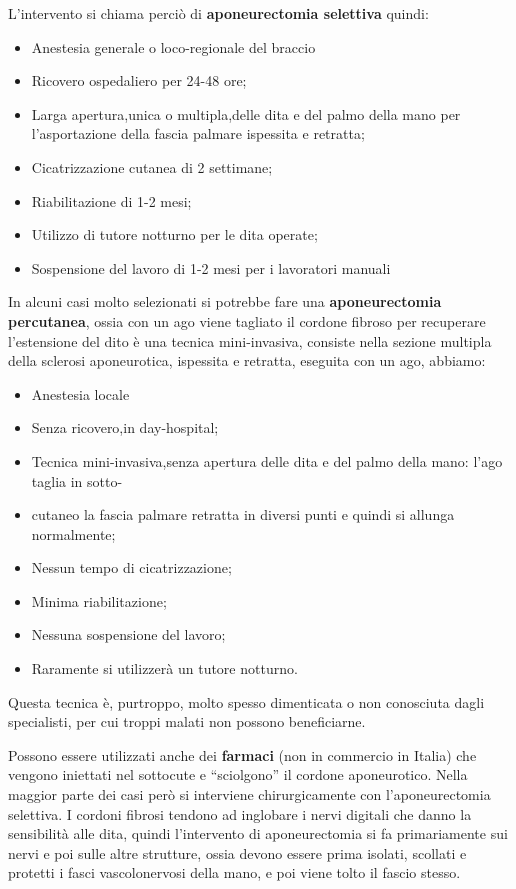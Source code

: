 L'intervento si chiama perciò di \textbf{aponeurectomia selettiva} quindi:

\begin{itemize}
\item
  Anestesia generale o loco-regionale del braccio
\item
  Ricovero ospedaliero per 24-48 ore;
\item
  Larga apertura,unica o multipla,delle dita e del palmo della mano per l'asportazione della fascia palmare ispessita e retratta;
\item
  Cicatrizzazione cutanea di 2 settimane;
\item
  Riabilitazione di 1-2 mesi;
\item
  Utilizzo di tutore notturno per le dita operate;
\item
  Sospensione del lavoro di 1-2 mesi per i lavoratori manuali
\end{itemize}

In alcuni casi molto selezionati si potrebbe fare una \textbf{aponeurectomia percutanea}, ossia con un ago viene tagliato il cordone fibroso per recuperare l'estensione del dito è una tecnica mini-invasiva, consiste nella sezione multipla della sclerosi
aponeurotica, ispessita e retratta, eseguita con un ago, abbiamo:

\begin{itemize}
\item
  Anestesia locale
\item
  Senza ricovero,in day-hospital;
\item
  Tecnica mini-invasiva,senza apertura delle dita e del palmo della mano: l'ago taglia in sotto-
\item
  cutaneo la fascia palmare retratta in diversi punti e quindi si allunga normalmente;
\item
  Nessun tempo di cicatrizzazione;
\item
  Minima riabilitazione;
\item
  Nessuna sospensione del lavoro;
\item
  Raramente si utilizzerà un tutore notturno.
\end{itemize}

Questa tecnica è, purtroppo, molto spesso dimenticata o non conosciuta dagli specialisti, per cui troppi malati non possono beneficiarne.

Possono essere utilizzati anche dei \textbf{farmaci} (non in commercio in Italia) che vengono iniettati nel sottocute e ``sciolgono'' il cordone aponeurotico. Nella maggior parte dei casi però si interviene chirurgicamente con l'aponeurectomia selettiva. I cordoni fibrosi tendono ad inglobare i nervi digitali che danno la sensibilità alle
dita, quindi l'intervento di aponeurectomia si fa primariamente sui nervi e poi sulle altre strutture, ossia devono essere prima isolati, scollati e protetti i fasci vascolonervosi della mano, e poi viene tolto il fascio stesso.

